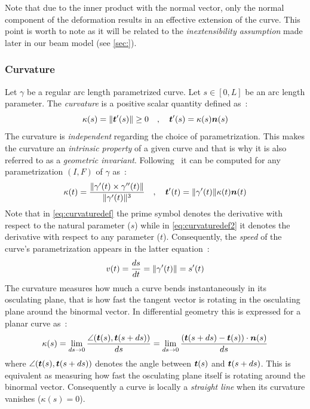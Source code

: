 Note that due to the inner product with the normal vector, only the normal component of the deformation results in an effective extension of the curve. This point is worth to note as it will be related to the \emph{inextensibility assumption} made later in our beam model (see \cref{sec:}).

\subsubsection{Curvature}
Let $\gamma$ be a regular arc length parametrized curve. Let $s \in [0,L]$ be an arc length parameter. The \emph{curvature} is a positive scalar quantity defined as~:
\begin{equation}
	\kappa(s) = \lVert\boldsymbol{t}'(s)\rVert \ge 0 
	\quad,\quad
	\boldsymbol{t}'(s) = \kappa(s) \boldsymbol{n}(s)
\label{eq:curvaturedef}
\end{equation}
The curvature is \emph{independent} regarding the choice of parametrization. This makes the curvature an \emph{intrinsic property} of a given curve and that is why it is also referred to as a \emph{geometric invariant}. Following~\cite[pp.203-204]{Gray2006} it can be computed for any parametrization $(I,F)$ of $\gamma$ as~:
\begin{equation}
	\kappa(t) = \frac{\lVert\gamma'(t) \times \gamma''(t)\rVert}{\lVert\gamma'(t)\rVert^3}
	\quad,\quad
	\boldsymbol{t}'(t) = \lVert\gamma'(t)\rVert \kappa(t) \boldsymbol{n}(t)
\label{eq:curvaturedef2}
\end{equation}
Note that in \cref{eq:curvaturedef} the prime symbol denotes the derivative with respect to the natural parameter ($s$) while in \cref{eq:curvaturedef2} it denotes the derivative with respect to any parameter ($t$). Consequently, the \emph{speed} of the curve's parametrization appears in the latter equation~:
\begin{equation}
	v(t) = \frac{ds}{dt} = \lVert\gamma'(t)\rVert = s'(t)
\end{equation}
The curvature measures how much a curve bends instantaneously in its osculating plane, that is how fast the tangent vector is rotating in the osculating plane around the binormal vector. In differential geometry this is expressed for a planar curve as~:
\begin{equation}
	\kappa(s)
	= \lim_{ds \to 0}\frac{\angle(\boldsymbol{t}(s),\boldsymbol{t}(s+ds))}{ds}
	= \lim_{ds \to 0}\frac{(\boldsymbol{t}(s+ds) - \boldsymbol{t}(s)) \cdot \boldsymbol{n}(s)}{ds}
\end{equation}
where $\angle(\boldsymbol{t}(s),\boldsymbol{t}(s+ds))$ denotes the angle between $\boldsymbol{t}(s)$ and $\boldsymbol{t}(s+ds)$. This is equivalent as measuring how fast the osculating plane itself is rotating around the binormal vector. Consequently a curve is locally a \emph{straight line} when its curvature vanishes ($\kappa(s)= 0$).

